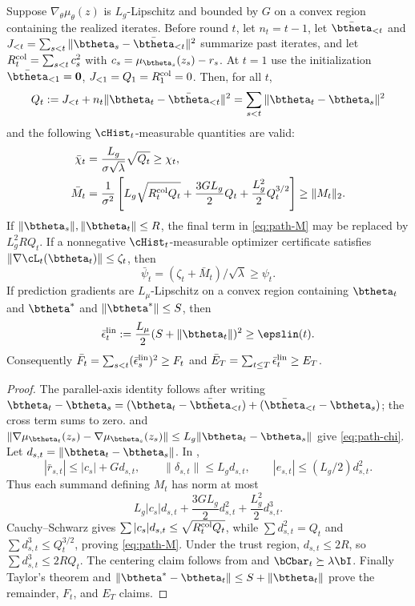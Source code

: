\begin{lemma}\label{lem:path-certificates}
Suppose $\nabla_\theta\mu_\theta(z)$ is $L_g$-Lipschitz and bounded by $G$
on a convex region containing the realized iterates.  Before round $t$, let
$n_t=t-1$, let $\bar\btheta_{<t}$ and
$J_{<t}=\sum_{s<t}\|\btheta_s-\bar\btheta_{<t}\|^2$ summarize past
iterates, and let
$R_t^{\rm col}=\sum_{s<t}c_s^2$ with
$c_s=\mu_{\btheta_s}(z_s)-r_s$.  At $t=1$ use the initialization
$\bar\btheta_{<1}=\mathbf0$, $J_{<1}=Q_1=R_1^{\rm col}=0$.  Then, for all $t$,
\[
 Q_t:=J_{<t}+n_t\|\btheta_t-\bar\btheta_{<t}\|^2
 =\sum_{s<t}\|\btheta_t-\btheta_s\|^2
\]
and the following $\cHist_t$-measurable quantities are valid:
\begin{align}
 \bar\chi_t&=\frac{L_g}{\sigma\sqrt\lambda}\sqrt{Q_t}\ge\chi_t,\label{eq:path-chi}\\
 \bar M_t&=\frac1{\sigma^2}\left[
 L_g\sqrt{R_t^{\rm col}Q_t}+\frac{3GL_g}{2}Q_t
 +\frac{L_g^2}{2}Q_t^{3/2}\right]\ge\|M_t\|_2.\label{eq:path-M}
\end{align}
If $\|\btheta_s\|,\|\btheta_t\|\le R$, the final term in
\eqref{eq:path-M} may be replaced by $L_g^2RQ_t$.  If a nonnegative
$\cHist_t$-measurable optimizer certificate satisfies
$\|\nabla\cL_t(\btheta_t)\|\le\zeta_t$, then
\[
 \bar\psi_t=(\zeta_t+\bar M_t)/\sqrt\lambda\ge\psi_t.
\]
If prediction gradients are $L_\mu$-Lipschitz on a convex region containing
$\btheta_t$ and $\btheta^*$ and $\|\btheta^*\|\le S$, then
\[
 \bar\epsilon_t^{\rm lin}:=\frac{L_\mu}{2}(S+\|\btheta_t\|)^2
 \ge\epslin(t).
\]
Consequently
$\bar F_t=\sum_{s<t}(\bar\epsilon_s^{\rm lin})^2\ge F_t$ and
$\bar E_T=\sum_{t\le T}\bar\epsilon_t^{\rm lin}\ge E_T$.
\end{lemma}
\begin{proof}
The parallel-axis identity follows after writing
$\btheta_t-\btheta_s=(\btheta_t-\bar\btheta_{<t})
+(\bar\btheta_{<t}-\btheta_s)$; the cross term sums to zero.
 and
$\|\nabla\mu_{\btheta_t}(z_s)-\nabla\mu_{\btheta_s}(z_s)\|
\le L_g\|\btheta_t-\btheta_s\|$ give \eqref{eq:path-chi}.
Let $d_{s,t}=\|\btheta_t-\btheta_s\|$.  In
,
\[
 |\bar r_{s,t}|\le |c_s|+Gd_{s,t},\qquad
 \|\delta_{s,t}\|\le L_gd_{s,t},\qquad
 |e_{s,t}|\le(L_g/2)d_{s,t}^2.
\]
Thus each summand defining $M_t$ has norm at most
\[
 L_g|c_s|d_{s,t}+\frac{3GL_g}{2}d_{s,t}^2
 +\frac{L_g^2}{2}d_{s,t}^3.
\]
Cauchy--Schwarz gives
$\sum|c_s|d_{s,t}\le\sqrt{R_t^{\rm col}Q_t}$, while
$\sum d_{s,t}^2=Q_t$ and
$\sum d_{s,t}^3\le Q_t^{3/2}$, proving \eqref{eq:path-M}.
Under the trust region, $d_{s,t}\le2R$, so
$\sum d_{s,t}^3\le2RQ_t$.  The centering claim follows from
 and $\bCbar_t\succeq\lambda\bI$.
Finally Taylor's theorem and
$\|\btheta^*-\btheta_t\|\le S+\|\btheta_t\|$ prove the remainder,
$F_t$, and $E_T$ claims.
\end{proof}

